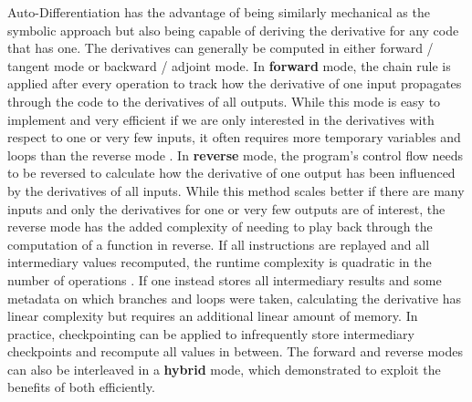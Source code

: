\noindent Auto-Differentiation has the advantage of being similarly mechanical as the symbolic approach but also being capable of deriving the derivative for any code that has one. The derivatives can generally be computed in either forward / tangent mode or backward / adjoint mode. In \textbf{forward} mode, the chain rule is applied after every operation to track how the derivative of one input propagates through the code to the derivatives of all outputs. While this mode is easy to implement and very efficient if we are only interested in the derivatives with respect to one or very few inputs, it often requires more temporary variables and loops than the reverse mode \cite{adifor-1992}. In \textbf{reverse} mode, the program's control flow needs to be reversed to calculate how the derivative of one output has been influenced by the derivatives of all inputs. While this method scales better if there are many inputs and only the derivatives for one or very few outputs are of interest, the reverse mode has the added complexity of needing to play back through the computation of a function in reverse. If all instructions are replayed and all intermediary values recomputed, the runtime complexity is quadratic in the number of operations \cite{tapenade-autodiff-2013}. If one instead stores all intermediary results and some metadata on which branches and loops were taken, calculating the derivative has linear complexity but requires an additional linear amount of memory. In practice, checkpointing can be applied to infrequently store intermediary checkpoints and recompute all values in between. The forward and reverse modes can also be interleaved in a \textbf{hybrid} mode, which \textcite{adifor-1992} demonstrated to exploit the benefits of both efficiently.

